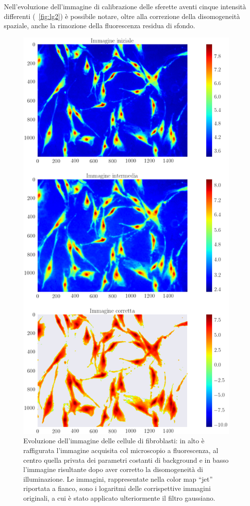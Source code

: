 Nell'evoluzione dell'immagine di calibrazione delle sferette aventi cinque intensità differenti (\figurename~\ref{fig:lg2}) è possibile notare, oltre alla correzione della disomogeneità spaziale, anche la rimozione della fluorescenza residua di sfondo.

\begin{figure}
 \centering
 \includegraphics[scale=.50]{img/CAP4lg3.png}
 \caption{\small{Evoluzione dell'immagine delle cellule di fibroblasti: in alto è raffigurata l'immagine acquisita col microscopio a fluorescenza, al centro quella privata dei parametri costanti di background e in basso l'immagine risultante dopo aver corretto la disomogeneità di illuminazione. Le immagini, rappresentate nella color map ``jet'' riportata a fianco, sono i logaritmi delle corrispettive immagini originali, a cui è stato applicato ulteriormente il filtro gaussiano.}}
 \label{fig:lg3}
\end{figure}

